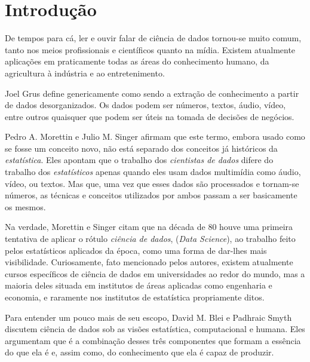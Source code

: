 
\chapter{Introdução}
\label{cap:introducao}


De tempos para cá, ler e ouvir falar de ciência de dados tornou-se muito comum, tanto nos meios profissionais e científicos quanto na mídia. Existem atualmente aplicações em praticamente todas as áreas do conhecimento humano, da agricultura à indústria e ao entretenimento.

Joel Grus \citep{data} define genericamente  como sendo a extração de conhecimento a partir de dados desorganizados. Os dados podem ser números, textos, áudio, vídeo, entre outros quaisquer que podem ser úteis na tomada de decisões de negócios.

Pedro A. Morettin e Julio M. Singer \citep{apostila} afirmam que este termo, embora usado como se fosse um conceito novo, não está separado dos conceitos já históricos da \emph{estatística}. Eles apontam que o trabalho dos \emph{cientistas de dados} difere do trabalho dos \emph{estatísticos} apenas quando eles usam dados multimídia como áudio, vídeo, ou textos. Mas que, uma vez que esses dados são processados e tornam-se números, as técnicas e conceitos utilizados por ambos passam a ser basicamente os mesmos.

Na verdade, Morettin e Singer \citep{apostila} citam que na década de 80 houve uma primeira tentativa de aplicar o rótulo \emph{ciência de dados}, (\emph{Data Science}), ao trabalho feito pelos estatísticos aplicados da época, como uma forma de dar-lhes mais visibilidade. Curiosamente, fato mencionado pelos autores, existem atualmente cursos específicos de ciência de dados em universidades ao redor do mundo, mas a maioria deles situada em institutos de áreas aplicadas como engenharia e economia, e raramente nos institutos de estatística propriamente ditos.

Para entender um pouco mais de seu escopo, David M. Blei e Padhraic Smyth \citep{blei} discutem ciência de dados sob as visões estatística, computacional e humana. Eles argumentam que é a combinação desses três componentes que formam a essência do que ela é e, assim como, do conhecimento que ela é capaz de produzir.

